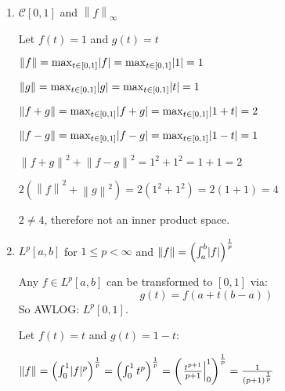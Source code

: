\documentclass[letterpaper,12pt,fleqn]{article}
\newcommand{\norm}[1]{\left\|#1\right\|}
\newcommand{\mc}{\mathcal{C}}
\begin{document}
\begin{examples}
  \listbreak
  \begin{enumerate}
  \item $\mc[0,1]$ and $\norm{f}_{\infty}$

    Let $f(t)=1$ and $g(t)=t$


    $\norm{f}=\max_{t\in[0,1]}\abs{f}=\max_{t\in[0,1]}\abs{1}=1$

    $\norm{g}=\max_{t\in[0,1]}\abs{g}=\max_{t\in[0,1]}\abs{t}=1$
    
    $\norm{f+g}=\max_{t\in[0,1]}\abs{f+g}=\max_{t\in[0,1]}\abs{1+t}=2$

    $\norm{f-g}=\max_{t\in[0,1]}\abs{f-g}=\max_{t\in[0,1]}\abs{1-t}=1$

    $\norm{f+g}^2+\norm{f-g}^2=1^2+1^2=1+1=2$

    $2(\norm{f}^2+\norm{g}^2)=2(1^2+1^2)=2(1+1)=4$

    $2\ne4$, therefore not an inner product space.

  \item $L^p[a,b]$ for $1\le p<\infty$ and
    $\norm{f}=\left(\int_a^b\abs{f}\right)^{\frac{1}{p}}$

    Any $f\in L^p[a,b]$ can be transformed to $[0,1]$ via:
    \[g(t)=f(a+t(b-a))\]
    So AWLOG: $L^p[0,1]$.

    Let $f(t)=t$ and $g(t)=1-t$:


    $\norm{f}=\left(\int_0^1\abs{f}^p\right)^{\frac{1}{p}}=
    \left(\int_0^1t^p\right)^{\frac{1}{p}}=
    \left(\left.\frac{t^{p+1}}{p+1}\right|_0^1\right)^{\frac{1}{p}}=
    \frac{1}{(p+1)^{\frac{1}{p}}}$


\end{enumerate}
\end{examples}
\end{document}
